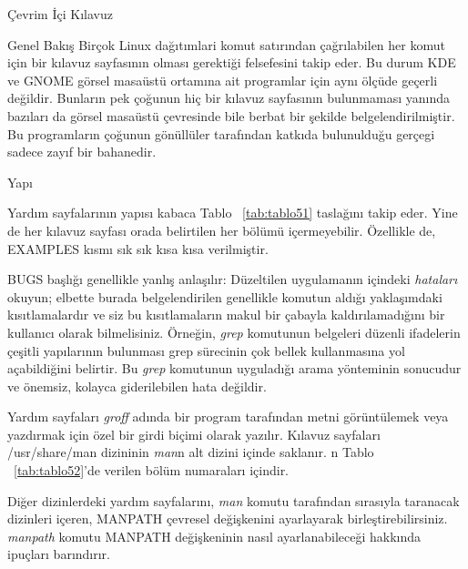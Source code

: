 \begin{section}{Çevrim İçi Kılavuz}
\begin{subsection}{Genel Bakış}
Birçok Linux dağıtımlari komut satırından çağrılabilen her komut için bir kılavuz sayfasının olması gerektiği felsefesini takip eder. Bu durum KDE ve GNOME görsel masaüstü ortamına ait programlar için aynı ölçüde geçerli değildir. Bunların pek çoğunun hiç bir kılavuz sayfasının bulunmaması yanında bazıları da görsel masaüstü çevresinde bile berbat bir şekilde belgelendirilmiştir. Bu programların çoğunun gönüllüler tarafından katkıda bulunulduğu gerçegi sadece zayıf bir bahanedir.
\end{subsection}
\begin{subsection}{Yapı}

Yardım sayfalarının yapısı kabaca Tablo ~\ref{tab:tablo51} taslağını takip eder. Yine de her kılavuz sayfası orada belirtilen her bölümü içermeyebilir. Özellikle de, EXAMPLES kısmı sık sık kısa kısa verilmiştir.

BUGS başlığı genellikle yanlış anlaşılır: Düzeltilen uygulamanın içindeki \emph{hataları} okuyun; elbette burada belgelendirilen genellikle komutun aldığı yaklaşımdaki kısıtlamalardır ve siz bu kısıtlamaların makul bir çabayla kaldırılamadığını bir kullanıcı olarak bilmelisiniz. Örneğin, \emph{grep} komutunun belgeleri düzenli ifadelerin çeşitli yapılarının bulunması grep sürecinin çok bellek kullanmasına yol açabildiğini belirtir. Bu \emph{grep} komutunun uyguladığı arama yönteminin sonucudur ve önemsiz, kolayca giderilebilen hata değildir.    

Yardım sayfaları \emph{groff} adında bir program tarafından metni görüntülemek veya yazdırmak için özel bir girdi biçimi olarak yazılır. Kılavuz sayfaları /usr/share/man dizininin \emph{man}n alt dizini içinde saklanır. n Tablo ~\ref{tab:tablo52}'de verilen bölüm numaraları içindir.

Diğer dizinlerdeki yardım sayfalarını, \emph{man} komutu tarafından sırasıyla taranacak dizinleri içeren, MANPATH çevresel değişkenini ayarlayarak birleştirebilirsiniz. \emph{manpath} komutu MANPATH değişkeninin nasıl ayarlanabileceği hakkında ipuçları barındırır.

\end{subsection}
\end{section}
